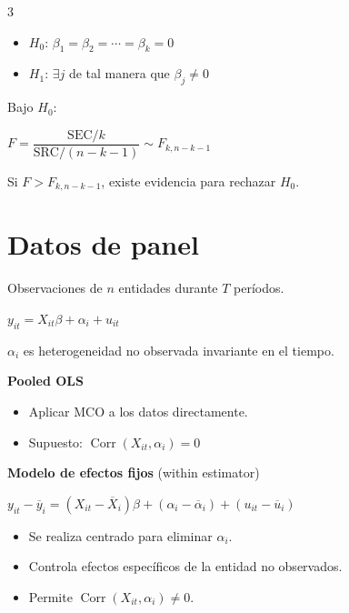 \documentclass[10pt, a4paper, landscape]{article}
\DeclareMathOperator{\Corr}{Corr}
\newcommand{\SSR}{\text{SRC}}
\newcommand{\SSE}{\text{SEC}}
\begin{document}
\begin{multicols}{3}
\begin{itemize}[leftmargin=*]
	\item \( H_{0} \): \( \beta_{1} = \beta_{2} = \cdots = \beta_{k} = 0 \)
	\item \( H_{1} \): \( \exists j \) de tal manera que \( \beta_{j} \neq 0 \)
\end{itemize}

Bajo \( H_{0} \):

\begin{center}
	\( F = \dfrac{\SSE / k}{\SSR / (n - k - 1)} \sim F_{k, n - k - 1} \)
\end{center}

Si \( F > F_{k, n - k - 1} \), existe evidencia para rechazar \( H_{0} \).

\columnbreak

\section*{Datos de panel}

Observaciones de \( n \) entidades durante \( T \) períodos.

\begin{center}
	\( y_{it} = X_{it} \beta + \alpha_{i} + u_{it} \)
\end{center}

\( \alpha_{i} \) es heterogeneidad no observada invariante en el tiempo.

\textbf{Pooled OLS}

\begin{itemize}[leftmargin=*]
	\item Aplicar MCO a los datos directamente.
	\item Supuesto: \( \Corr(X_{it}, \alpha_{i}) = 0 \)
\end{itemize}

\textbf{Modelo de efectos fijos} (within estimator)

\begin{center}
	\( y_{it} - \overline{y}_{i} = (X_{it} - \overline{X}_{i}) \beta + (\alpha_{i} - \overline{\alpha}_{i}) + (u_{it} - \overline{u}_{i}) \)
\end{center}

\begin{itemize}[leftmargin=*]
	\item Se realiza centrado para eliminar \( \alpha_{i} \).
	\item Controla efectos específicos de la entidad no observados.
	\item Permite \( \Corr(X_{it}, \alpha_{i}) \neq 0 \).
\end{itemize}


\end{multicols}
\end{document}

